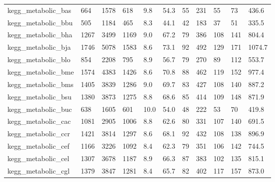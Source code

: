 \begin{longtable}{lllllllllll}
 kegg\_metabolic\_bas                                 & 664        & 1578      & 618   & 9.8    & 54.3   & 55    & 231    & 55     & 73     & 436.6   \\
 kegg\_metabolic\_bbu                                 & 505        & 1184      & 465   & 8.3    & 44.1   & 42    & 183    & 37     & 51     & 335.5   \\
 kegg\_metabolic\_bha                                 & 1267       & 3499      & 1169  & 9.0    & 67.2   & 79    & 386    & 108    & 141    & 804.4   \\
 kegg\_metabolic\_bja                                 & 1746       & 5078      & 1583  & 8.6    & 73.1   & 92    & 492    & 129    & 171    & 1074.7  \\
 kegg\_metabolic\_blo                                 & 854        & 2208      & 795   & 8.9    & 56.7   & 79    & 270    & 89     & 112    & 553.7   \\
 kegg\_metabolic\_bme                                 & 1574       & 4383      & 1426  & 8.6    & 70.8   & 88    & 462    & 119    & 152    & 977.4   \\
 kegg\_metabolic\_bms                                 & 1405       & 3839      & 1286  & 9.0    & 69.7   & 83    & 427    & 108    & 140    & 887.2   \\
 kegg\_metabolic\_bsu                                 & 1380       & 3873      & 1275  & 8.8    & 68.6   & 85    & 414    & 109    & 148    & 871.9   \\
 kegg\_metabolic\_buc                                 & 638        & 1605      & 601   & 10.0   & 54.0   & 48    & 222    & 53     & 70     & 419.8   \\
 kegg\_metabolic\_cac                                 & 1081       & 2905      & 1006  & 8.8    & 62.6   & 80    & 331    & 107    & 140    & 691.5   \\
 kegg\_metabolic\_ccr                                 & 1421       & 3814      & 1297  & 8.6    & 68.1   & 92    & 432    & 108    & 138    & 896.9   \\
 kegg\_metabolic\_cef                                 & 1166       & 3226      & 1092  & 8.4    & 62.3   & 79    & 351    & 106    & 142    & 744.5   \\
 kegg\_metabolic\_cel                                 & 1307       & 3678      & 1187  & 8.9    & 66.3   & 87    & 383    & 102    & 135    & 815.1   \\
 kegg\_metabolic\_cgl                                 & 1379       & 3847      & 1281  & 8.4    & 65.7   & 82    & 402    & 117    & 157    & 873.0   \\

\end{longtable}
